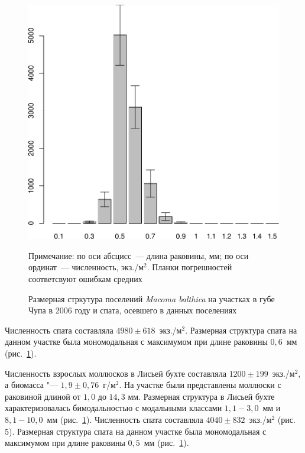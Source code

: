 \begin{figure}[p]
\begin{minipage}[b]{.49\linewidth}
\begin{center}
	\end{center}
	\end{minipage}
%
	\hfil %
%
	\begin{minipage}[b]{.49\linewidth}
	\begin{center}	
		\includegraphics[width=0.215\textheight]{../White_Sea/spat/spat_str_Podpahta_1.pdf}
	\end{center}
	\end{minipage}
		\caption{Размерная стркутура поселений {\it Macoma balthica} на участках в губе Чупа в 2006 году и спата, осевшего в данных поселениях}
		\label{ris:Chupa_spat_sizestr}
\footnotesize{Примечание: по оси абсцисс~--- длина раковины, мм; по оси ординат~--- численность, экз./м$^2$. Планки погрешностей соответсвуют ошибкам средних}
	\end{figure}
Численность спата составляла $4980 \pm 618$~экз./м$^2$. 
Размерная структура спата на данном участке была мономодальная с максимумом при длине раковины $0,6$~мм (рис.~\ref{ris:Chupa_spat_sizestr}).

Численность взрослых моллюсков в Лисьей бухте составляла $1200 \pm 199$~экз./м$^2$, а биомасса "--- $1,9 \pm 0,76$~г/м$^2$. 
На участке были представлены моллюски с раковиной длиной от $1,0$ до $14,3$ мм. 
Размерная структура в Лисьей бухте характеризовалась бимодальностью с модальными классами $1,1 - 3,0$~мм и $8,1 - 10,0$~мм (рис.~\ref{ris:Chupa_spat_sizestr}). 
Численность спата составляла $4040 \pm 832$~экз./м$^2$ (рис. 5). 
Размерная структура спата на данном участке была мономодальная с максимумом при длине раковины $0,5$~мм (рис.~\ref{ris:Chupa_spat_sizestr}).

